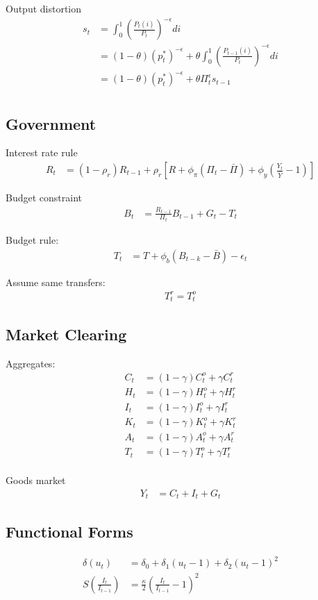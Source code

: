 \documentclass[11pt]{article}
\begin{document}
Output distortion
\begin{align*}
	s_t &= \int_0^1 \left(\frac{P_{t}(i)}{P_t}\right)^{-\epsilon}di \\
	&= (1-\theta)(p_t^*)^{-\epsilon} + \theta \int_0^1   \left(\frac{P_{t-1}(i)}{P_t}\right)^{-\epsilon}di \\
	&=(1-\theta)(p_t^*)^{-\epsilon} + \theta \Pi_t^{\epsilon} s_{t-1} \\
\end{align*}


\subsection{Government}

Interest rate rule
\begin{align*}
	R_t &= (1-\rho_r)R_{t-1} + \rho_r\left[R + \phi_\pi(\Pi_t-\bar{\Pi}) + \phi_y\left(\frac{Y_t}{\bar{Y}}-1\right)\right]
\end{align*}

Budget constraint
\begin{align*}
	B_t &= \frac{R_{t-1}}{\Pi_t}B_{t-1} + G_t - T_t
\end{align*}


Budget rule:
\begin{align*}
	T_t &= T + \phi_b(B_{t-k}-\bar{B}) - \epsilon_t
\end{align*}

Assume same transfers:
\begin{align*}
	T_t^r = T_t^o
\end{align*}

\subsection{Market Clearing}

Aggregates:
\begin{align*}
	C_t &= (1-\gamma) C_t^o + \gamma C_t^r \\
	H_t &= (1-\gamma) H_t^o + \gamma H_t^r \\
	I_t &= (1-\gamma) I_t^o + \gamma I_t^r \\
	K_t &= (1-\gamma) K_t^o + \gamma K_t^r \\
	A_t &= (1-\gamma) A_t^o + \gamma A_t^r \\
	T_t &= (1-\gamma) T_t^o + \gamma T_t^r \\
\end{align*}

Goods market
\begin{align*}
	Y_t &= C_t + I_t + G_t
\end{align*}


\subsection{Functional Forms}

\begin{align*}
	\delta(u_t) &= \delta_0 + \delta_1 (u_t-1) + \delta_2 (u_t-1)^2 \\
	S\left(\frac{I_t}{I_{t-1}}\right) &=\frac{\kappa}{2}\left(\frac{I_t}{I_{t-1}}-1\right)^{2}
\end{align*}
\end{document}
